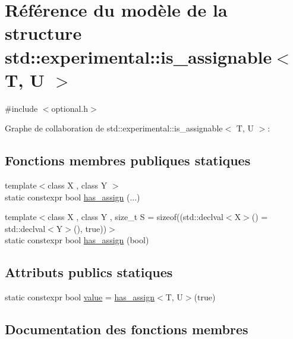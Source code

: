 \hypertarget{structstd_1_1experimental_1_1is__assignable}{}\section{Référence du modèle de la structure std\+:\+:experimental\+:\+:is\+\_\+assignable$<$ T, U $>$}
\label{structstd_1_1experimental_1_1is__assignable}


{\ttfamily \#include $<$optional.\+h$>$}



Graphe de collaboration de std\+:\+:experimental\+:\+:is\+\_\+assignable$<$ T, U $>$\+:
\subsection*{Fonctions membres publiques statiques}
\begin{DoxyCompactItemize}
\item 
{\footnotesize template$<$class X , class Y $>$ }\\static constexpr bool \hyperlink{structstd_1_1experimental_1_1is__assignable_af8698cf73e8d40f6af5bafa292f9e532}{has\+\_\+assign} (...)
\item 
{\footnotesize template$<$class X , class Y , size\+\_\+t S = sizeof((std\+::declval$<$\+X$>$() = std\+::declval$<$\+Y$>$(), true))$>$ }\\static constexpr bool \hyperlink{structstd_1_1experimental_1_1is__assignable_a826902a90f85d2a25cbab409ebe1aff6}{has\+\_\+assign} (bool)
\end{DoxyCompactItemize}
\subsection*{Attributs publics statiques}
\begin{DoxyCompactItemize}
\item 
static constexpr bool \hyperlink{structstd_1_1experimental_1_1is__assignable_a670223830052ed42e41e453386027b45}{value} = \hyperlink{structstd_1_1experimental_1_1is__assignable_af8698cf73e8d40f6af5bafa292f9e532}{has\+\_\+assign}$<$T, U$>$(true)
\end{DoxyCompactItemize}


\subsection{Documentation des fonctions membres}
\mbox{\label{structstd_1_1experimental_1_1is__assignable_af8698cf73e8d40f6af5bafa292f9e532}} 
